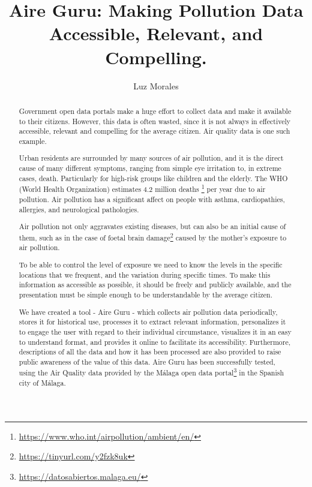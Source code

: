 \documentclass[final,2p,times]{elsarticle}
\begin{document}
\begin{frontmatter}

\title{Aire Guru: Making Pollution Data Accessible, Relevant, and Compelling.}

\author{Luz Morales}
\address{International University of La Rioja}

\begin{abstract}
Government open data portals make a huge effort to collect data and make it available to their citizens.
However, this data is often wasted, since it is not always in effectively accessible, relevant and compelling
for the average citizen. Air quality data is one such example.

Urban residents are surrounded by many sources of air pollution, and it is the direct cause of many different symptoms, ranging from simple eye irritation 
to, in extreme cases, death. Particularly for high-risk groups like children and the elderly.
The WHO (World Health Organization) estimates 4.2 million deaths
\footnote{\url{https://www.who.int/airpollution/ambient/en/}} per year due to air pollution.
Air pollution has a significant affect on people with asthma, cardiopathies, allergies, and neurological pathologies.

Air pollution not only aggravates existing diseases, but can also be an initial cause of them, such as in the case of foetal brain
damage\footnote{\url{https://tinyurl.com/y2fzk8uk}} 
caused by the mother's exposure to air pollution.

To be able to control the level of exposure we need to know the levels
in the specific locations that we frequent, and the variation during specific times.
To make this information as accessible as possible, it should be freely and publicly available, and the presentation
must be simple enough to be understandable by the average citizen.

We have created a tool - Aire Guru - which collects air pollution data periodically, stores it for historical use, 
processes it to extract relevant information, personalizes it to engage the user with regard to their individual
circumstance, visualizes it in an easy to understand format, and provides it online to facilitate its accessibility. Furthermore,
descriptions of all the data and how it has been processed are also provided to raise public awareness of the value
of this data. Aire Guru has been successfully tested, using the Air Quality data provided
by the Málaga open data portal\footnote{\url{https://datosabiertos.malaga.eu/}} in the Spanish city of Málaga.


\end{abstract}
\end{frontmatter}
\end{document}

